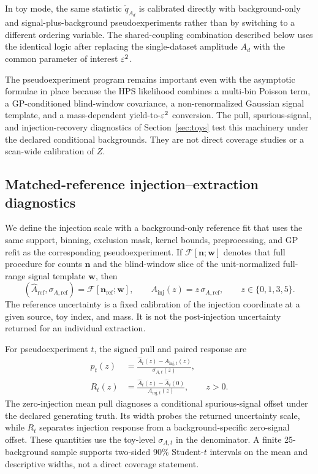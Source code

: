 In toy mode, the same statistic $\tilde q_{A_d}$ is calibrated directly with
background-only and signal-plus-background pseudoexperiments rather than by switching
to a different ordering variable. The shared-coupling combination described below uses
the identical logic after replacing the single-dataset amplitude $A_d$ with the common
parameter of interest $\varepsilon^2$.

The pseudoexperiment program remains important even with the asymptotic formulae in
place because the HPS likelihood combines a multi-bin Poisson term, a GP-conditioned
blind-window covariance, a non-renormalized Gaussian signal template, and a
mass-dependent yield-to-$\varepsilon^2$ conversion. The pull, spurious-signal, and
injection-recovery diagnostics of Section~\ref{sec:toys} test this machinery under the
declared conditional backgrounds. They are not direct \CLs{} coverage studies or a
scan-wide calibration of $Z$.

\subsection{Matched-reference injection--extraction diagnostics}
\label{sec:matched-reference-diagnostics}

We define the injection scale with a background-only reference fit that uses the same
support, binning, exclusion mask, kernel bounds, preprocessing, and GP refit as the
corresponding pseudoexperiment. If
$\mathcal{F}[\bm n;\bm w]$ denotes that full procedure for counts $\bm n$ and the
blind-window slice of the unit-normalized full-range signal template $\bm w$, then
\begin{equation}
(\widehat A_{\mathrm{ref}},\sigma_{A,\mathrm{ref}})
=\mathcal{F}[\bm n_{\mathrm{ref}};\bm w],
\qquad
A_{\mathrm{inj}}(z)=z\,\sigma_{A,\mathrm{ref}},
\qquad z\in\{0,1,3,5\}.
\label{eq:v4p9-matched-reference-axis}
\end{equation}
The reference uncertainty is a fixed calibration of the injection coordinate at a
given source, toy index, and mass.  It is not the post-injection uncertainty returned
for an individual extraction.

For pseudoexperiment $t$, the signed pull and paired response are
\begin{align}
p_t(z)&=\frac{\widehat A_t(z)-A_{\mathrm{inj},t}(z)}
                  {\sigma_{A,t}(z)},
\label{eq:v4p9-pull}\\
R_t(z)&=\frac{\widehat A_t(z)-\widehat A_t(0)}
                  {A_{\mathrm{inj},t}(z)},\qquad z>0.
\label{eq:v4p9-paired-response}
\end{align}
The zero-injection mean pull diagnoses a conditional spurious-signal offset under the
declared generating truth.  Its width probes the returned uncertainty scale, while
$R_t$ separates injection response from a background-specific zero-signal offset.
These quantities use the toy-level $\sigma_{A,t}$ in the denominator.  A finite
25-background sample supports two-sided 90\% Student-$t$ intervals on the mean and descriptive
widths, not a direct coverage statement.

